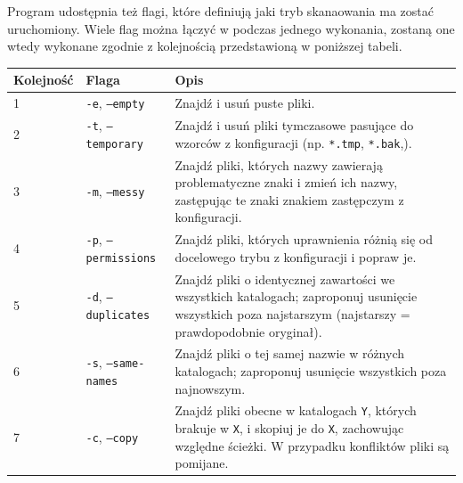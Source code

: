 \documentclass[12pt, a4paper]{article}
\begin{document}
Program udostępnia też flagi, które definiują jaki tryb skanaowania ma zostać
uruchomiony. Wiele flag można łączyć w podczas jednego wykonania, zostaną one
wtedy wykonane zgodnie z kolejnością przedstawioną w poniższej tabeli.
\begin{table}[H]
	\begin{tabularx}{\textwidth}{|l|l|X|}
		\hline
		\textbf{Kolejność} & \textbf{Flaga}                        & \textbf{Opis}                                                                                                                                                                 \\
		\hline
		1                  & \texttt{-e},  \texttt{---empty}       & Znajdź i usuń puste pliki.                                                                                                                                                    \\
		\hline
		2                  & \texttt{-t},  \texttt{---temporary}   & Znajdź i usuń pliki tymczasowe pasujące do wzorców z konfiguracji (np. \texttt{*.tmp}, \texttt{*.bak},).                                                                      \\
		\hline
		3                  & \texttt{-m},  \texttt{---messy}       & Znajdź pliki, których nazwy zawierają problematyczne znaki i zmień ich nazwy, zastępując te znaki znakiem zastępczym z konfiguracji.                                          \\
		\hline
		4                  & \texttt{-p},  \texttt{---permissions} & Znajdź pliki, których uprawnienia różnią się od docelowego trybu z konfiguracji i popraw je.                                                                                  \\
		\hline
		5                  & \texttt{-d},  \texttt{---duplicates}  & Znajdź pliki o identycznej zawartości we wszystkich katalogach; zaproponuj usunięcie wszystkich poza najstarszym (najstarszy = prawdopodobnie oryginał).                      \\
		\hline
		6                  & \texttt{-s},  \texttt{---same-names}  & Znajdź pliki o tej samej nazwie w różnych katalogach; zaproponuj usunięcie wszystkich poza najnowszym.                                                                        \\
		\hline
		7                  & \texttt{-c},  \texttt{---copy}        & Znajdź pliki obecne w katalogach \texttt{Y}, których brakuje w \texttt{X}, i skopiuj je do \texttt{X}, zachowując względne ścieżki. W przypadku konfliktów pliki są pomijane. \\
		\hline
	\end{tabularx}
\end{table}
\end{document}
